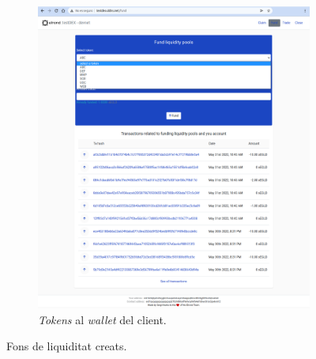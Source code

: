 \documentclass[11pt,a4paper]{article}
\begin{document}
\begin{figure}[!htb]
\begin{subfigure}[b]{0.42\textwidth}
	  \includegraphics[width=\linewidth]{imp-liqpools2.png}
	  \caption{\textit{Tokens} al \textit{wallet} del client.}\label{fig:imp-liqpools2}
	\end{subfigure}\hfill
	\caption{Fons de liquiditat creats.}
\end{figure}
\end{document}
